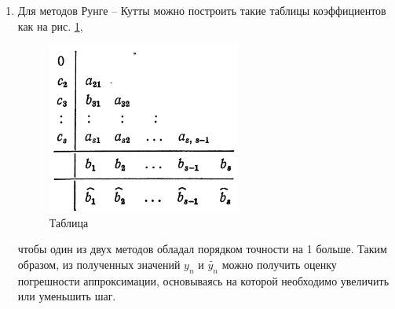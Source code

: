 \documentclass[12pt, a4paper]{article}
\begin{document}
\begin{enumerate}
\begin{enumerate}
			\item Для методов Рунге -- Кутты можно построить такие таблицы коэффициентов как на рис. \ref{fig:Special-Butcher}, 
			\begin{figure}[h]
				\centering
				\includegraphics[width=0.6\textwidth]{butcher_table_sp}
				\caption{Таблица }
				\label{fig:Special-Butcher}
			\end{figure}
			 чтобы один из двух методов обладал порядком точности на 1 больше. Таким образом, из полученных значений $y_n$ и $\tilde{y_n}$ можно получить оценку погрешности аппроксимации, основываясь на которой необходимо увеличить или уменьшить шаг.
		\end{enumerate}
		
	\end{enumerate}
\end{document}
